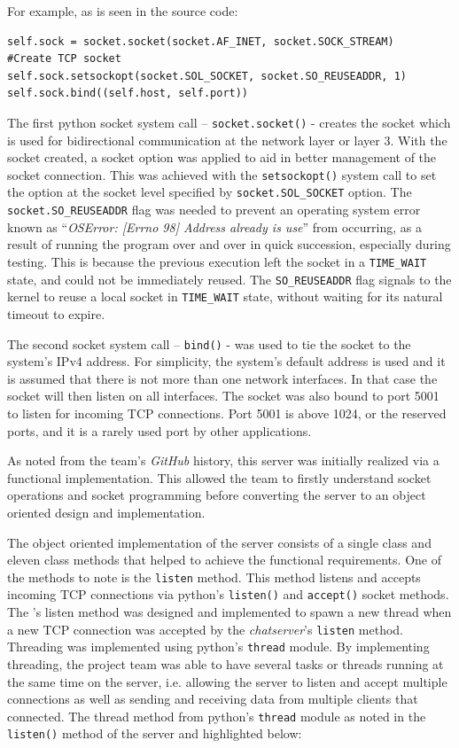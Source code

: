 \documentclass[finalReport.tex]{subfiles}
\begin{document}
For example, as is seen in the source code:

\begin{lstlisting}
self.sock = socket.socket(socket.AF_INET, socket.SOCK_STREAM)   #Create TCP socket
self.sock.setsockopt(socket.SOL_SOCKET, socket.SO_REUSEADDR, 1)
self.sock.bind((self.host, self.port))
\end{lstlisting}

The first python socket system call – \lstinline'socket.socket()' - creates the socket which is used for bidirectional communication at the network layer or layer 3. With the socket created, a socket option was applied to aid in better management of the socket connection. This was achieved with the \lstinline'setsockopt()' system call to set the option at the socket level specified by \lstinline'socket.SOL_SOCKET' option. The  \lstinline'socket.SO_REUSEADDR' flag was needed to prevent an operating system error known as ``\textit{OSError: [Errno 98] Address already is use}'' from occurring, as a result of running the program over and over in quick succession, especially during testing. This is because the previous execution left the socket in a \lstinline'TIME_WAIT' state, and could not be immediately reused. The \lstinline'SO_REUSEADDR' flag signals to the kernel to reuse a local socket in \lstinline'TIME_WAIT' state, without waiting for its natural timeout to expire.

The second socket system call – \lstinline'bind()' - was used to tie the socket to the system's IPv4 address. For simplicity, the system's default address is used and it is assumed that there is not more than one network interfaces. In that case the socket will then listen on all interfaces. The socket was also bound to port 5001 to listen for incoming TCP connections. Port 5001 is above 1024, or the reserved ports, and it is a rarely used port by other applications.

As noted from the team's \textit{GitHub} history, this server was initially realized via a functional implementation. This allowed the team to firstly understand socket operations and socket programming before converting the server to an object oriented design and implementation.

The object oriented implementation of the server consists of a single class and eleven class methods that helped to achieve the functional requirements. One of the methods to note is the \lstinline'listen' method. This method listens and accepts incoming TCP connections via python's \lstinline'listen()' and \lstinline'accept()' socket methods. The 's listen method was designed and implemented to spawn a new thread when a new TCP connection was accepted by the \textit{chatserver}'s \lstinline'listen' method. Threading was implemented using python's \lstinline'thread' module. By implementing threading, the project team was able to have several tasks or threads running at the same time on the server, i.e. allowing the server to listen and accept multiple connections as well as sending and receiving data from multiple clients that connected.  The thread method from python's \lstinline'thread' module as noted in the \lstinline'listen()' method of the server and highlighted below:
\end{document}
